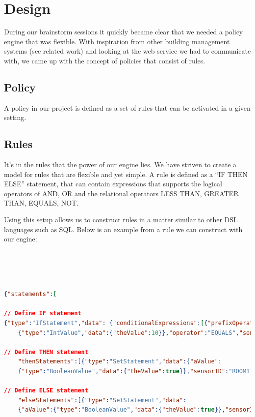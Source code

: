 \section{Design}
During our brainstorm sessions it quickly became clear that we needed a policy engine that was flexible. With inspiration from other building management systems (see related work) and looking at the web service we had to communicate with, we came up with the concept of policies that consist of rules.

\subsection{Policy}
A policy in our project is defined as a set of rules that can be activated in a given setting.

\subsection{Rules}
It's in the rules that the power of our engine lies. We have striven to create a model for rules that are flexible and yet simple. A rule is defined as a "`IF THEN ELSE"' statement, that can contain expressions that supports the logical operators of AND, OR and the relational operators LESS THAN, GREATER THAN, EQUALS, NOT. 

Using this setup allows us to construct rules in a matter similar to other DSL languages such as SQL. Below is an example from a rule we can construct with our engine:
\\
\\
\\
\\
\\
\begin{lstlisting}[language=json,firstnumber=1]
{"statements":[

// Define IF statement
{"type":"IfStatement","data": {"conditionalExpressions":[{"prefixOperator":"AND","aValue":
	{"type":"IntValue","data":{"theValue":10}},"operator":"EQUALS","sensorId":"ROOM1.TEMPERATURE"}],

// Define THEN statement	
	"thenStatements":[{"type":"SetStatement","data":{"aValue":
	{"type":"BooleanValue","data":{"theValue":true}},"sensorID":"ROOM1.HEATER"}}],

// Define ELSE statement
	"elseStatements":[{"type":"SetStatement","data":
	{"aValue":{"type":"BooleanValue","data":{"theValue":true}},"sensorID":"ROOM1.BLINDS"}}]}}]}
\end{lstlisting}

